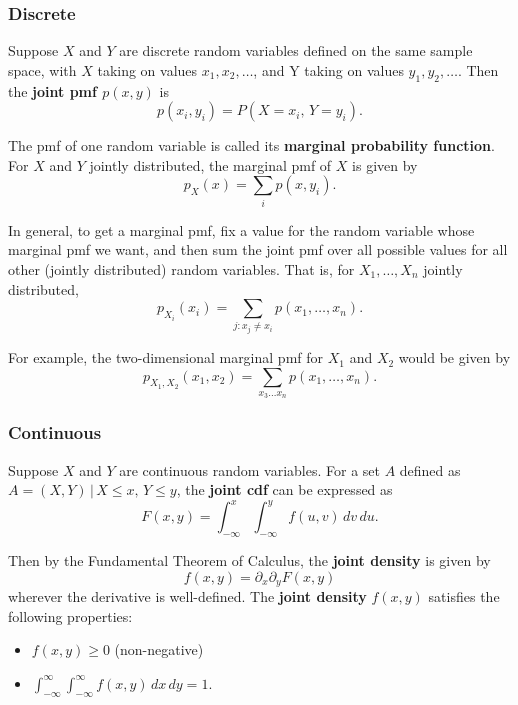 \documentclass[a4paper,10pt]{article}
\begin{document}
\subsubsection{Discrete}

Suppose $X$ and $Y$ are discrete random variables defined on the same sample space, with $X$ taking on values $x_1, x_2, \ldots$, and Y taking on values $y_1, y_2, \ldots$. Then the \textbf{joint pmf $p(x, y)$} is 
\begin{equation*}
    p(x_i, y_i) = P(X=x_i,\,Y=y_i).
\end{equation*}

The pmf of one random variable is called its \textbf{marginal probability function}. For $X$ and $Y$ jointly distributed, the marginal pmf of $X$ is given by 
\begin{equation*}
    p_X(x) = \sum_i p(x, y_i).
\end{equation*}

In general, to get a marginal pmf, fix a value for the random variable whose marginal pmf we want, and then sum the joint pmf over all possible values for all other (jointly distributed) random variables. That is, for $X_1, \ldots, X_n$ jointly distributed, 
\begin{equation*}
    p_{X_i}(x_i) = \sum_{j:x_j\neq x_i} p(x_1, \ldots, x_n).
\end{equation*}

For example, the two-dimensional marginal pmf for $X_1$ and $X_2$ would be given by 
\begin{equation*}
    p_{X_1, X_2}(x_1, x_2) = \sum_{x_3\ldots x_n} p(x_1, \ldots, x_n).
\end{equation*}

\subsubsection{Continuous}

Suppose $X$ and $Y$ are continuous random variables. For a set $A$ defined as $A={(X, Y)\,|\,X\leq x,\,Y\leq y}$, the \textbf{joint cdf} can be expressed as
\begin{equation*}
    F(x, y) = \int_{-\infty}^x \int_{-\infty}^y f(u, v)\,dv\,du.
\end{equation*}

Then by the Fundamental Theorem of Calculus, the \textbf{joint density} is given by 
\begin{equation*}
    f(x, y) = \partial_x\partial_y F(x, y)
\end{equation*}
wherever the derivative is well-defined. The \textbf{joint density} $f(x, y)$ satisfies the following properties:
\begin{itemize}
    \item $f(x, y) \geq 0$ (non-negative)
    \item $\displaystyle \int_{-\infty}^{\infty}\int_{-\infty}^{\infty}f(x, y) \,dx\,dy = 1$.
\end{itemize}
\end{document}
